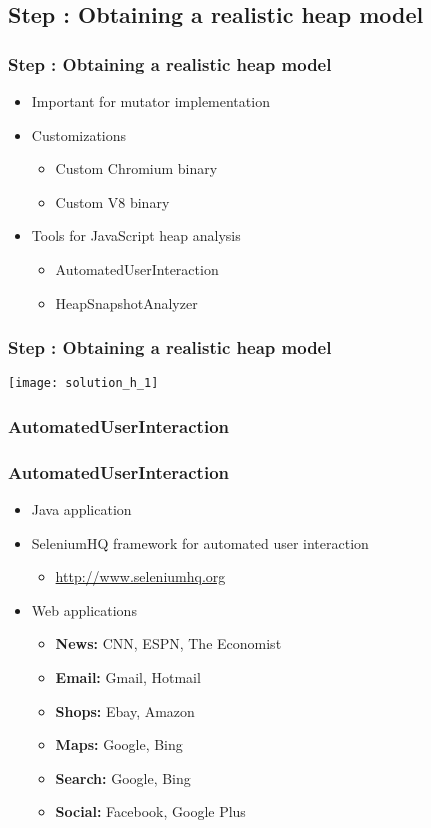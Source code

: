 \subsection{Step \theStepCounter: Obtaining a realistic heap model}
\begin{frame}
	\frametitle{Step \theStepCounter: Obtaining a realistic heap model}
	\begin{itemize}
		\item Important for mutator implementation
		\item Customizations
		\begin{itemize}
			\item Custom Chromium binary
			\item Custom V8 binary
		\end{itemize}
			
		\pause
			
		\item Tools for JavaScript heap analysis
		\begin{itemize}
			\item AutomatedUserInteraction
			\item HeapSnapshotAnalyzer
		\end{itemize}
	\end{itemize}
\end{frame}
	
\begin{frame}
	\frametitle{Step \theStepCounter: Obtaining a realistic heap model}		
	\texttt{[image: solution\_h\_1]}
\end{frame}

\subsubsection{AutomatedUserInteraction}
\begin{frame}
	\frametitle{AutomatedUserInteraction}
	\begin{itemize}
		\item Java application
		\item SeleniumHQ framework for automated user interaction
		\begin{itemize}
			\item \href{http://www.seleniumhq.org/}{http://www.seleniumhq.org}
		\end{itemize}
		\item Web applications
		\begin{itemize}
			\item \textbf{News:} CNN, ESPN, The Economist
			\item \textbf{Email:} Gmail, Hotmail
			\item \textbf{Shops:} Ebay, Amazon
			\item \textbf{Maps:} Google, Bing
			\item \textbf{Search:} Google, Bing
			\item \textbf{Social:} Facebook, Google Plus
		\end{itemize}
	\end{itemize}
\end{frame}
	
